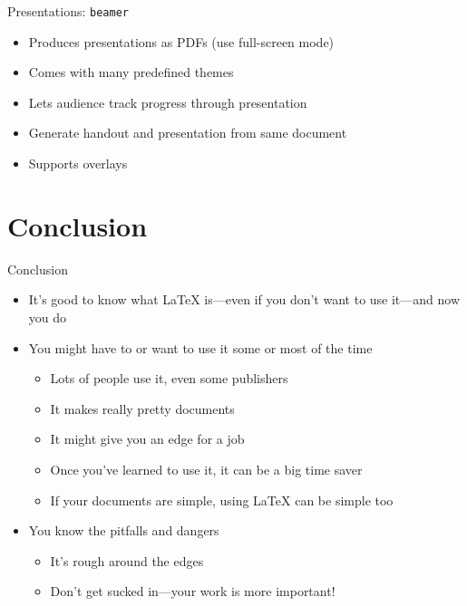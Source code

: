 \begin{frame}{Presentations: \texttt{beamer}}

\begin{itemize}[<+->]
\item Produces presentations as PDFs (use full-screen mode)
\item Comes with many predefined themes
\item Lets audience track progress through presentation
\item Generate handout and presentation from same document
\item Supports overlays
\end{itemize}

\end{frame}

\section{Conclusion}

\begin{frame}{Conclusion}

\begin{itemize}
\item It's good to know what \LaTeX{} is---even if you don't want to
  use it---and now you do
\item You might have to or want to use it some or most of the time 
\begin{itemize}
\item Lots of people use it, even some publishers
\item It makes really pretty documents
\item It might give you an edge for a job
\item Once you've learned to use it, it can be a big time saver
\item If your documents are simple, using \LaTeX{} can be simple too 
\end{itemize}
\item You know the pitfalls and dangers
\begin{itemize}
\item It's rough around the edges
\item Don't get sucked in---your work is more important!
\end{itemize}
\end{itemize}
\end{frame}


